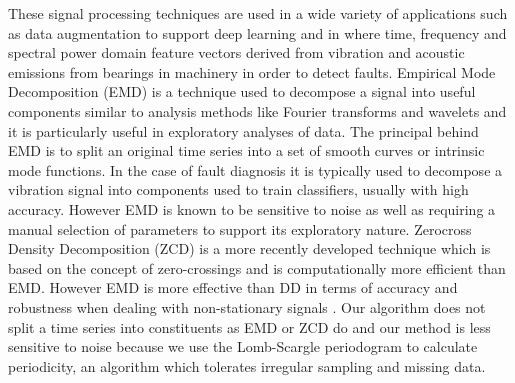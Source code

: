\documentclass[preprints,article,accept,pdftex,moreauthors]{Definitions/mdpi}
\begin{document}
{These signal processing techniques are used in a wide variety of applications such as data augmentation to support deep learning \cite{Abay10.1007/978-3-030-61401-0_65} and in \cite{Altafs22052012} where time, frequency and spectral power domain feature vectors derived from vibration and acoustic emissions from bearings in machinery in order to detect faults. Empirical Mode Decomposition (EMD) is a technique used to decompose a signal into useful components similar to analysis methods like Fourier transforms and wavelets and it is particularly useful in exploratory analyses of data. The principal behind EMD is to split an original time series into a set of smooth curves or intrinsic mode functions. In the case of fault diagnosis it is typically used  to decompose a vibration signal into components used to train classifiers, usually with high accuracy.  However EMD is known to be sensitive to noise as well as requiring a manual selection of parameters \cite{cohen2014analyzing} to support its exploratory nature. Zerocross Density Decomposition (ZCD) is a more recently developed technique \cite{Sidekerskiene2020} which is based on the concept of zero-crossings and is computationally more efficient than EMD. However EMD is more effective than DD in terms of accuracy and robustness when dealing with non-stationary signals \cite{uzunouglu2018comparative}.
Our algorithm does not split a time series into constituents as EMD or ZCD do and our method is less sensitive to noise because we use the Lomb-Scargle periodogram \cite{VanderPlas_2018} to calculate periodicity, an algorithm which tolerates irregular sampling and missing data.
}

\end{document}
